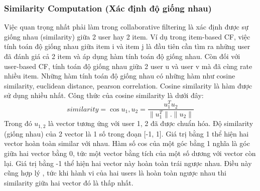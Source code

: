 \subsubsection{Similarity Computation (Xác định độ giống nhau)}
Việc quan trọng nhất phải làm trong collaborative filtering là xác định được sự giống nhau (similarity) giữa 2 user hay 2 item. Ví dụ trong item-based CF, việc tính toán độ giống nhau giữa item i và item j là đầu tiên cần tìm ra những user đã đánh giá cả 2 item và áp dụng hàm tính toán độ giống nhau. Còn đối với user-based CF, tính toán độ giống nhau giữa 2 user u và user v mà đã cùng rate nhiều item. Những hàm tính toán độ giống nhau có những hàm như cosine similarity, euclidean distance, pearson correlation.
\newline Cosine similarity là hàm được sử dụng nhiều nhất. Công thức của cosine similarity là dưới đây:
\begin{equation}
    similarity = \cos{u_1, u_2} = \frac{u^T_1 u_2}{\|u^T_1\|.\|u_2\|}
\end{equation}
\newline Trong đó $u_{1,2}$ là vector tương ứng với user 1, 2 đã được chuẩn hóa.
\newline Độ similarity (giống nhau) của 2 vector là 1 số trong đoạn [-1, 1]. Giá trị bằng 1 thể hiện hai vector hoàn toàn similar với nhau. Hàm số cos của một góc bằng 1 nghĩa là góc giữa hai vector bằng 0, tức một vector bằng tích của một số dương với vector còn lại. Giá trị bằng -1 thể hiện hai vector này hoàn toàn trái ngược nhau. Điều này cũng hợp lý , tức khi hành vi của hai users là hoàn toàn ngược nhau thi similarity giữa hai vector đó là thấp nhất.

